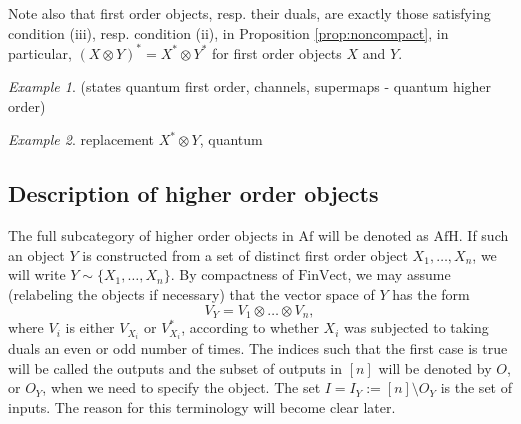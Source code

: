 \documentclass[12pt]{article}
\theoremstyle{definition}
\theoremstyle{remark}
\newtheorem{exm}{Example}
\def \Afh{\mathrm{AfH}}
\def \Af{\mathrm{Af}}
\def \FV{\mathrm{FinVect}}
\begin{document}
Note also that first order objects, resp. their duals, are exactly those satisfying
condition (iii), resp. condition (ii), in Proposition \ref{prop:noncompact}, in
particular, $(X\otimes Y)^*=X^*\otimes Y^*$ for first order objects $X$ and $Y$.

\begin{exm} (states quantum first order, channels,  supermaps - quantum higher order)

\end{exm}

\begin{exm} replacement $X^*\otimes Y$, quantum
\end{exm}

\subsection{Description of higher order objects}


The full subcategory of higher order objects in $\Af$ will be denoted as $\Afh$. If such
an object  $Y$ is constructed from a set of distinct first order object $X_1,\dots, X_n$,
 we will write $Y\sim\{X_1,\dots,X_n\}$.  By compactness of $\FV$, we may assume
 (relabeling the objects if necessary) that the vector space of $Y$ has the form
\[
V_Y=V_{1}\otimes \dots\otimes V_{n},
\]
where  $V_i$ is either $V_{X_i}$ or $V_{X_i}^*$, according to whether $X_i$ was subjected
to taking duals an even or odd number of times. The indices such that the first
case is true will be called the outputs and the subset of outputs in $[n]$ will be denoted
by $O$, or $O_Y$, when we need to specify the object. The set $I=I_Y:=[n]\setminus O_Y$ is
the set of inputs. The reason for this terminology will become clear later.
\end{document}
